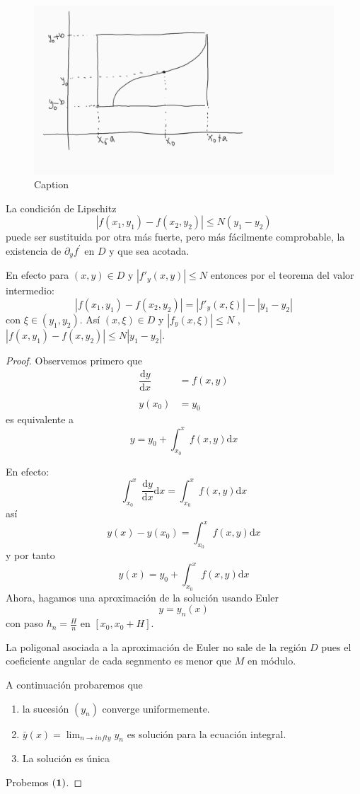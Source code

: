 \begin{figure}[H]
    \centering
    \includegraphics[scale=0.25]{graficas1.png}
    \caption{Caption}
    \label{fig:my_label}
\end{figure}


La condici\'on de Lipschitz 
$$
|f(x_1,y_1)-f(x_2,y_2)|\leq N(y_1-y_2)
$$
puede ser sustituida por otra m\'as fuerte, pero m\'as f\'acilmente comprobable, la existencia de $\partial_{y} f^{'}$ en $D$ y que sea acotada.

En efecto para $(x,y)\in D$ y $|f'_y(x,y)|\leq N$ entonces por el teorema del valor intermedio:
$$
|f(x_1,y_1)-f(x_2,y_2)|=|f'_y(x,\xi)|-|y_1-y_2| 
$$
con $\xi\in (y_1,y_2)$. As\'i $(x,\xi)\in D$ y $|f_y(x,\xi)|\leq N$ , $|f(x,y_1)-f(x,y_2)|\leq N|y_1-y_2|$.

\begin{proof}
Observemos primero que 
$$
\left.\begin{array}{cc}
    \dfrac{\mathrm{d}y}{\mathrm{d}x}&=f(x,y)  \\
    &\\
    y(x_0) &=y_0 
\end{array}\right.
$$
es equivalente a
$$
y=y_0+\int_{x_0}^xf(x,y)\mathrm{d}x
$$

En efecto:
$$
\int_{x_0}^x\frac{\mathrm{d}y}{\mathrm{d}x}\mathrm{d}x=\int_{x_0}^xf(x,y)\mathrm{d}x
$$
así
$$
y(x)-y(x_0)=\int_{x_0}^xf(x,y)\mathrm{d}x
$$
y por tanto
$$
y(x)=y_0+\int_{x_0}^xf(x,y)\mathrm{d}x
$$
Ahora, hagamos una aproximaci\'on de  la soluci\'on usando Euler
$$
y=y_n(x)
$$
con paso $h_n=\frac{H}{n}$ en $[x_0,x_0+H]$.

La poligonal asociada a la aproximaci\'on de Euler no sale de la regi\'on $D$ pues el coeficiente angular de cada segnmento es menor  que $M$ en m\'odulo.

A continuaci\'on probaremos que
\begin{enumerate}
\item la sucesi\'on  $(y_n)$ converge uniformemente.
\item $\bar{y}(x)=\lim_{n\rightarrow infty}y_n$ es soluci\'on para la ecuaci\'on integral.
  \item La soluci\'on es \'unica
\end{enumerate} 

Probemos $\bf{(1)}$. 
\end{proof}
 